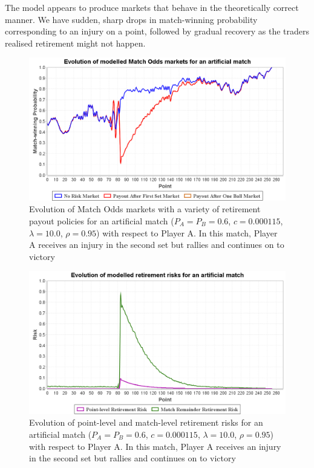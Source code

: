 \documentclass[authoryear, 12pt]{elsarticle}
\begin{document}
The model appears to produce markets that behave in the theoretically correct manner.  We have sudden, sharp drops in match-winning probability corresponding to an injury on a point, followed by gradual recovery as the traders realised retirement might not happen.

\begin{figure}[h!]
\centering \includegraphics[width=12.5cm]{matches/artificialwin}
\caption{Evolution of Match Odds markets with a variety of retirement payout policies for an artificial match ($P_A = P_B = 0.6$, $c = 0.000115$, $\lambda = 10.0$, $\rho = 0.95$) with respect to Player A.  In this match, Player A receives an injury in the second set but rallies and continues on to victory}
\label{artificialwin}
\end{figure}

\begin{figure}[H]
\centering \includegraphics[width=12.5cm]{matches/artificialwinrisk}
\caption{Evolution of point-level and match-level retirement risks for an artificial match ($P_A = P_B = 0.6$, $c = 0.000115$, $\lambda = 10.0$, $\rho = 0.95$) with respect to Player A.  In this match, Player A receives an injury in the second set but rallies and continues on to victory}
\label{artificialwinrisk}
\end{figure}
\end{document}
